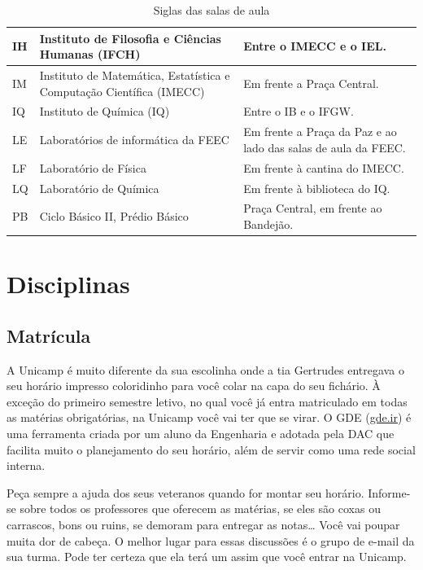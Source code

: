 \begin{center}
\begin{table}[ht!]
{\begin{tabular}{|l|p{6cm}|p{8cm}|}
 IH  &  Instituto de Filosofia e Ciências Humanas (IFCH)  &  Entre o IMECC e o IEL.\tabularnewline \hline

 IM  &  Instituto de Matemática, Estatística e Computação Científica (IMECC)  &  Em frente a Praça Central.\tabularnewline \hline

 IQ  &  Instituto de Química (IQ)  &  Entre o IB e o IFGW.\tabularnewline \hline

 LE  &  Laboratórios de informática da FEEC  &  Em frente a Praça da Paz e ao lado das salas de aula da FEEC.\tabularnewline \hline

 LF  &  Laboratório de Física  &  Em frente à cantina do IMECC.\tabularnewline \hline

 LQ  &  Laboratório de Química  &  Em frente à biblioteca do IQ.\tabularnewline \hline

 PB  &  Ciclo Básico II, Prédio Básico  &  Praça Central, em frente ao Bandejão.\tabularnewline \hline

\end{tabular}
}
\hfill{}
\caption{Siglas das salas de aula}
\label{tab:institutos}
\end{table}
\end{center}

\section{Disciplinas}

\subsection{Matrícula}

A Unicamp é muito diferente da sua escolinha onde a tia Gertrudes entregava
o seu horário impresso coloridinho para você colar na capa do seu fichário.
À exceção do primeiro semestre letivo, no qual você já entra matriculado em
todas as matérias obrigatórias, na Unicamp você vai ter que se virar.  O GDE
(\url{gde.ir}) é uma ferramenta criada por um aluno da Engenharia e adotada
pela DAC que facilita muito o planejamento do seu horário, além de servir como
uma rede social interna.

Peça sempre a ajuda dos seus veteranos quando for montar seu horário. Informe-se
sobre todos os professores que oferecem as matérias, se eles são coxas ou
carrascos, bons ou ruins, se demoram para entregar as notas{\dots} Você vai
poupar muita dor de cabeça. O melhor lugar para essas discussões é o grupo de
e-mail da sua turma.  Pode ter certeza que ela terá um assim que você entrar na
Unicamp.

